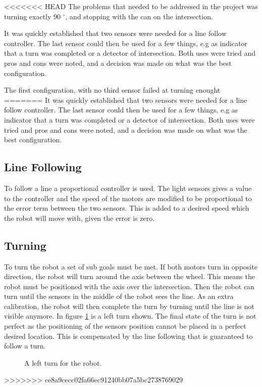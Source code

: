 <<<<<<< HEAD
The problems that needed to be addressed in the project was turning exactly 90 $^{\circ}$, and stopping with the can on the intersection.

It was quickly established that two sensors were needed for a line follow controller. The last sensor could then be used for a few things, e.g as indicator that a turn was completed or a detector of intersection. Both uses were tried and pros and cons were noted, and a decision was made on what was the best configuration.


The first configuration, with no third sensor failed at turning enought	
=======
It was quickly established that two sensors were needed for a line follow controller. The last sensor could then be used for a few things, e.g as indicator that a turn was completed or a detector of intersection. Both uses were tried and pros and cons were noted, and a decision was made on what was the best configuration. 

\subsection{Line Following}
To follow a line a proportional controller is used.
The light sensors gives a value to the controller and the speed of the motors are modified to be proportional to the error term between the two sensors.
This is added to a desired speed which the robot will move with, given the error is zero.

\begin{figure}
\end{figure}


\subsection{Turning}
To turn the robot a set of sub goals must be met.
If both motors turn in opposite direction, the robot will turn around the axis between the wheel.
This means the robot must be positioned with the axis over the intersection.
Then the robot can turn until the sensors in the middle of the robot sees the line.
As an extra calibration, the robot will then complete the turn by turning until the line is not visible anymore.
In figure \ref{fig:left_turn} is a left turn shown.
The final state of the turn is not perfect as the positioning of the sensors position cannot be placed in a perfect desired location.
This is compensated by the line following that is guaranteed to follow a turn.

\begin{figure}

 \caption{A left turn for the robot.}
 \label{fig:left_turn}
\end{figure}

>>>>>>> ce8a9cecc02fa66ec91240bb07a5bc2738769029
